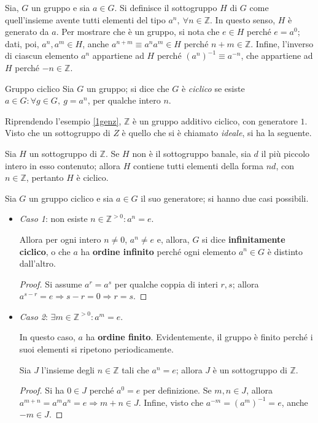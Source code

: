 \documentclass[11pt, a4paper]{scrartcl}
\theoremstyle{definition}
\numberwithin{esempio}{section}
\theoremstyle{definition}
\numberwithin{obs}{section}
\numberwithin{nota}{section}
\numberwithin{equation}{subsection}
\begin{document}
Sia, $G$ un gruppo e sia $a \in  G$.
Si definisce il sottogruppo $H$ di $G$ come quell'insieme avente tutti elementi del tipo $a^n, \ \forall n \in \mathbb{Z}$. 
In questo senso, $H$ \`e generato da $a$.
Per mostrare che \`e un gruppo, si nota che $e \in H$ perch\'e $e = a^ 0 $; dati, poi, $a^n,a^m \in H$, anche $a^{n+m} \equiv a^n a^m \in H $ perch\'e $n+m \in \mathbb{Z}$.
Infine, l'inverso di ciascun elemento $a^n$ appartiene ad $H$ perch\'e $(a^n)^{-1} \equiv a^{-n}  $, che appartiene ad $H$ perch\'e $-n \in \mathbb{Z}$.
\begin{definizione}
	{Gruppo ciclico}{}
	Sia $G$ un gruppo; si dice che $G$ \`e \textit{ciclico} se esiste $a \in G : \forall g \in G, \ g = a^n$, per qualche intero $n$.
\end{definizione}
\noindent Riprendendo l'esempio \ref{1genz}, $\mathbb{Z}$ \`e un gruppo additivo ciclico, con generatore $1$.
Visto che un sottogruppo di $Z$ \`e quello che si \`e chiamato \textit{ideale}, si ha la seguente.
\begin{prop}
	{}{}
	Sia $H$ un sottogruppo di $\mathbb{Z}$. Se $H$ non \`e il sottogruppo banale, sia $d$ il pi\`u piccolo intero in esso contenuto; allora $H$ contiene tutti elementi della forma $nd$, con $n \in \mathbb{Z}$, pertanto $H$ \`e ciclico.
\end{prop}
Sia $G$ un gruppo ciclico e sia $a \in G$ il suo generatore; si hanno due casi possibili.
\begin{itemize}
	\item \textit{Caso 1}: non esiste $n \in \mathbb{Z}^{>0} : a^n = e$.

		Allora per ogni intero $n \neq 0$, $a^n \neq e$ e, allora, $G$ si dice \textbf{infinitamente ciclico}, o che $a$ ha \textbf{ordine infinito} perch\'e ogni elemento $a^n \in G$ \`e distinto dall'altro.
		\begin{proof}
			Si assume $a^r = a^s$ per qualche coppia di interi $r,s$; allora $a^{s-r} = e \Rightarrow s-r = 0 \Rightarrow r=s$.
		\end{proof}
	\item \textit{Caso 2}: $\exists m \in \mathbb{Z}^{>0} : a^m = e$.

		In questo caso, $a$ ha \textbf{ordine finito}. Evidentemente, il gruppo \`e finito perch\'e i suoi elementi si ripetono periodicamente. 

		Sia $J$ l'insieme degli $n \in \mathbb{Z}$ tali che $a^n = e$; allora $J$ \`e un sottogruppo di $\mathbb{Z}$.
		\begin{proof}
			Si ha $0 \in J$ perch\'e $a^0 = e$ per definizione. Se $m,n \in J$, allora $a^{m+n} = a^m a^n = e \Rightarrow  m+n \in J$.
			Infine, visto che $a^{-m} = (a^m)^{-1} =e$, anche $-m \in J$.
		\end{proof}
\end{itemize}
\end{document}
